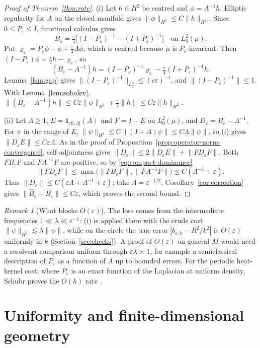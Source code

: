 \documentclass[11pt,a4paper]{article}
\theoremstyle{definition}\newtheorem{definition}[theorem]{Definition}
\theoremstyle{remark}\newtheorem{remark}[theorem]{Remark}
\newcommand{\eps}{\varepsilon}
\newcommand{\norm}[1]{\lVert #1\rVert}
\begin{document}
\begin{proof}[Proof of Theorem~\ref{thm:rate}]
(i) Let $h\in H^2$ be centred and $\phi=A^{-1}h$. Elliptic regularity for $A$ on the closed manifold gives $\norm\phi_{H^4}\le C\norm h_{H^2}$. Since $0\le P_\eps\le I$, functional calculus gives
\[
B_\eps=\tfrac\eps4\bigl[(I-P_\eps)^{-1}-(I+P_\eps)^{-1}\bigr]\quad\text{on }L^2_0(\mu).
\]
Put $\varrho_\eps=P_\eps\phi-\phi+\tfrac\eps4A\phi$, which is centred because $\mu$ is $P_\eps$-invariant. Then $(I-P_\eps)\phi=\tfrac\eps4h-\varrho_\eps$, so
\[
(B_\eps-A^{-1})h=(I-P_\eps)^{-1}\varrho_\eps-\tfrac\eps4(I+P_\eps)^{-1}h.
\]
Lemma~\ref{lem:gap} gives $\norm{(I-P_\eps)^{-1}}_{L^2_0}\le(c\eps)^{-1}$, and $\norm{(I+P_\eps)^{-1}}\le1$. With Lemma~\ref{lem:sobolev},
$\norm{(B_\eps-A^{-1})h}\le C\eps\norm\phi_{H^4}+\tfrac\eps4\norm h\le C\eps\norm h_{H^2}$.

(ii) Let $\Lambda\geq1$, $E=\mathbf 1_{(0,\Lambda]}(A)$ and $F=I-E$ on $L^2_0(\mu)$, and $D_\eps=B_\eps-A^{-1}$. For $\psi$ in the range of $E$, $\norm\psi_{H^2}\le C\norm{(I+A)\psi}\le C\Lambda\norm\psi$, so (i) gives $\norm{D_\eps E}\le C\eps\Lambda$. As in the proof of Proposition~\ref{prop:operator-norm-convergence}, self-adjointness gives $\norm{D_\eps}\le2\norm{D_\eps E}+\norm{FD_\eps F}$. Both $FB_\eps F$ and $FA^{-1}F$ are positive, so by \eqref{eq:compact-dominance}
\[
\norm{FD_\eps F}\le\max\bigl(\norm{FB_\eps F},\norm{FA^{-1}F}\bigr)\le C(\Lambda^{-1}+\eps).
\]
Thus $\norm{D_\eps}\le C(\eps\Lambda+\Lambda^{-1}+\eps)$; take $\Lambda=\eps^{-1/2}$. Corollary~\ref{cor:correction} gives $\norm{\widehat B_\eps-B_\eps}\le C\eps$, which proves the second bound.
\end{proof}

\begin{remark}[What blocks $O(\eps)$]
The loss comes from the intermediate frequencies $1\ll\lambda\ll\eps^{-1}$: (i) is applied there with the crude cost $\norm\psi_{H^2}\lesssim\lambda\norm\psi$, while on the circle the true error $|b_{\eps,k}-R^2/k^2|$ is $O(\eps)$ uniformly in $k$ (Section~\ref{sec:checks}). A proof of $O(\eps)$ on general $M$ would need a resolvent comparison uniform through $\eps\lambda\asymp1$, for example a semiclassical description of $P_\eps$ as a function of $A$ up to bounded errors. For the periodic heat-kernel cost, where $P_\eps$ is an exact function of the Laplacian at uniform density, Schubr proves the $O(h)$ rate \cite{SchubrSharp}.
\end{remark}

\section{Uniformity and finite-dimensional geometry}\label{sec:families}
\end{document}
